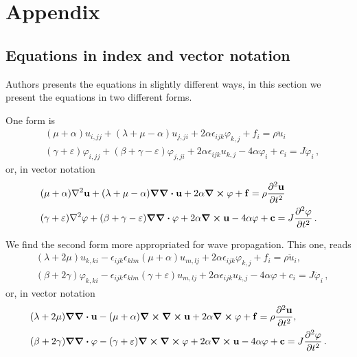 \documentclass[12pt]{article}
\begin{document}
\section*{Appendix}

\subsection*{Equations in index and vector notation}
Authors presents the equations in slightly different ways, in this section we present the equations in two different forms.

One form is
\begin{subequations}
  \begin{align}
    & (\mu + \alpha) u_{i, jj} + (\lambda + \mu - \alpha) u_{j,ji} + 2\alpha \epsilon_{ijk}\varphi_{k,j} + f_i = \rho \ddot{u}_i\, \\
    & (\gamma + \varepsilon) \varphi_{i, jj} + (\beta + \gamma - \varepsilon) \varphi_{j,ji} + 2\alpha \epsilon_{ijk}u_{k,j} - 4\alpha \varphi_i  + c_i = J \ddot{\varphi}_i\, ,
  \end{align}
\end{subequations}
or, in vector notation
\begin{align*}
    & (\mu + \alpha)\laplacian{\vb{u}} + (\lambda + \mu - \alpha) \grad\div\vb{u} + 2\alpha \curl\vb{\varphi} + \vb{f} = \rho \pdv[2]{\vb{u}}{t}\, \\
    & (\gamma + \varepsilon) \laplacian\vb{\varphi} + (\beta + \gamma - \varepsilon) \grad\div\vb{\varphi} + 2\alpha \curl\vb{u} - 4\alpha \vb{\varphi}  + \vb{c} = J \pdv[2]{\varphi}{t}\, .
\end{align*}

We find the second form more appropriated for wave propagation. This one, reads
\begin{subequations}
  \begin{align}
    & (\lambda + 2\mu) u_{k, ki} - \epsilon_{ijk} \epsilon_{klm} (\mu + \alpha) u_{m,lj}+ 2\alpha \epsilon_{ijk} \varphi_{k,j} + f_i = \rho \ddot{u}_i, \\
    & (\beta + 2\gamma) \varphi_{k, ki} - \epsilon_{ijk} \epsilon_{klm} (\gamma + \varepsilon) u_{m,lj}+ 2\alpha \epsilon_{ijk} u_{k,j} - 4\alpha\varphi + c_i = J \ddot{\varphi}_i\, ,
  \end{align}
\end{subequations}
or, in vector notation
\begin{subequations}\label{eq:disp_vector}
  \begin{align}
    & (\lambda + 2\mu) \grad\div\vb{u} - (\mu + \alpha)\curl\curl\vb{u} + 2\alpha \curl\vb{\varphi} + \vb{f} = \rho \pdv[2]{\vb{u}}{t}, \\
    & (\beta + 2\gamma) \grad\div\vb{\varphi} - (\gamma + \varepsilon) \curl\curl\vb{\varphi} +  2\alpha \curl\vb{u} - 4\alpha\vb{\varphi} + \vb{c} = J \pdv[2]{\vb{\varphi}}{t}\, .
  \end{align}
\end{subequations}






\end{document}
